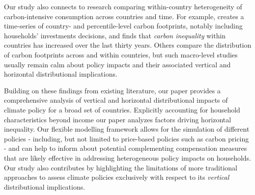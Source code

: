 \documentclass[12pt, a4paper]{article}
\begin{document}
Our study also connects to research comparing within-country heterogeneity of carbon-intensive consumption across countries and time. For example, \textcite{Chancel.2022} creates a time-series of country- and percentile-level carbon footprints, notably including households' investments decisions, and finds that \textit{carbon inequality} within countries has increased over the last thirty years. Others \autocite{Oswald.2020,Bruckner.2022} compare the distribution of carbon footprints across and within countries, but such macro-level studies usually remain calm about policy impacts and their associated vertical and horizontal distributional implications.

Building on these findings from existing literature, our paper provides a comprehensive analysis of vertical and horizontal distributional impacts of climate policy for a broad set of countries. Explicitly accounting for household characteristics beyond income our paper analyzes factors driving horizontal inequality. Our flexible modelling framework allows for the simulation of different policies - including, but not limited to price-based policies such as carbon pricing - and can help to inform about potential complementing compensation measures that are likely effective in addressing heterogeneous policy impacts on households. Our study also contributes by highlighting the limitations of more traditional approaches to assess climate policies exclusively with respect to its \textit{vertical} distributional implications.

\end{document}
